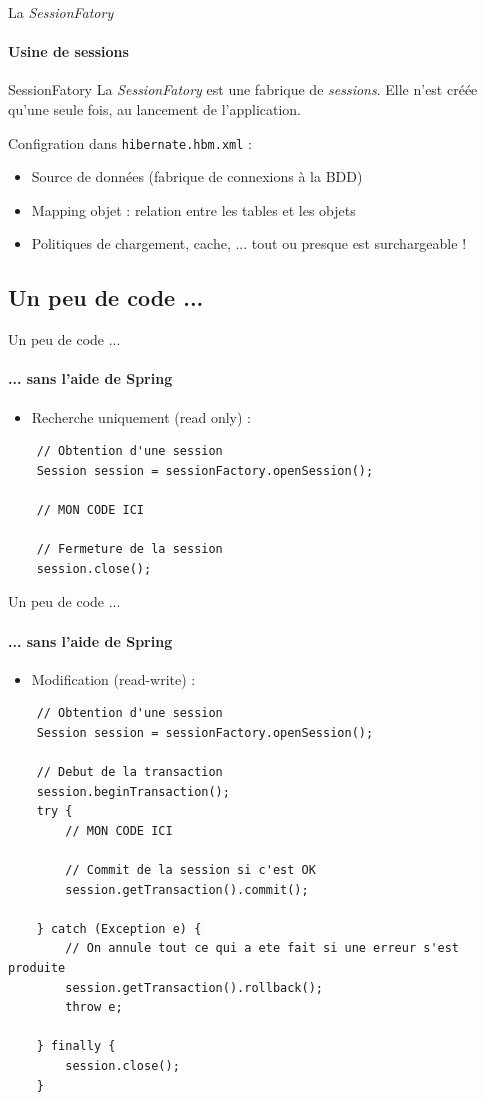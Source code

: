 \documentclass[compact]{beamer}%
\begin{document}
\begin{frame}{La \emph{SessionFatory}}
	\framesubtitle{Usine de sessions}
	
	\begin{block}{SessionFatory}
	La \emph{SessionFatory} est une fabrique de \emph{sessions}. Elle n'est créée qu'une seule fois, au lancement de l'application.
	\end{block}	
	
	\pause	
	Configration dans \texttt{hibernate.hbm.xml} :
	\begin{itemize}
	\item Source de données (fabrique de connexions à la BDD)
	\item Mapping objet : relation entre les tables et les objets
	\item Politiques de chargement, cache, ... tout ou presque est surchargeable !
	\end{itemize}
\end{frame}

	
\subsection{Un peu de code ...}

\begin{frame}[containsverbatim]{Un peu de code ...}
	\framesubtitle{... sans l'aide de Spring}
	
	\begin{itemize}
	\item Recherche uniquement (read only) : 	
	\end{itemize}	
	\begin{lstlisting}
	// Obtention d'une session
	Session session = sessionFactory.openSession();
	
	// MON CODE ICI	
	
	// Fermeture de la session
	session.close();
	\end{lstlisting}
	
\end{frame}

\begin{frame}[containsverbatim]{Un peu de code ...}
	\framesubtitle{... sans l'aide de Spring}
	
	\begin{itemize}
	\item Modification (read-write) :
	\end{itemize}	
	\begin{lstlisting}
	// Obtention d'une session
	Session session = sessionFactory.openSession();
 
 	// Debut de la transaction
	session.beginTransaction();
	try {
		// MON CODE ICI	
	
		// Commit de la session si c'est OK
		session.getTransaction().commit();
		
	} catch (Exception e) {
		// On annule tout ce qui a ete fait si une erreur s'est produite
		session.getTransaction().rollback();
		throw e;
		
	} finally {
		session.close();
	}
	\end{lstlisting}
	
\end{frame}
\end{document}
